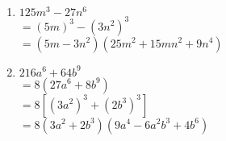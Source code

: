 \begin{enumerate}
\item \hspce $125m^{3} - 27n^{6}$\\
$= (5 m)^3 - (3 n^{2})^3$\\
$= \left(5 m - 3 n^{2}\right) \left(25 m^{2} + 15 m n^{2} + 9 n^{4}\right)$

\item \hspce $216a^{6} + 64b^9$\\
$= 8(27a^{6} + 8b^9)$\\
$= 8[(3 a^{2})^3 + (2 b^{3})^3]$\\
$= 8 \left(3 a^{2} + 2 b^{3}\right) \left(9 a^{4} - 6 a^{2} b^{3} + 4 b^{6}\right)$


% 
\end{enumerate}